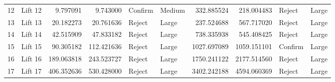 \begin{tabular}{llrrllrrll}
12 &  Lift 12 &           9.797091 &            9.743000 &  Confirm &      Medium &               332.885524 &                218.004483 &   Reject &       Large \\
13 &  Lift 13 &          20.182273 &           20.761636 &   Reject &       Large &               237.524688 &                567.717020 &   Reject &       Large \\
14 &  Lift 14 &          42.515909 &           47.833182 &   Reject &       Large &               738.335938 &                545.408425 &   Reject &       Large \\
15 &  Lift 15 &          90.305182 &          112.421636 &   Reject &       Large &              1027.697089 &               1059.151101 &  Confirm &       Large \\
16 &  Lift 16 &         189.063818 &          243.523727 &   Reject &       Large &              1750.241122 &               2177.514560 &   Reject &       Large \\
17 &  Lift 17 &         406.352636 &          530.428000 &   Reject &       Large &              3402.242188 &               4594.060369 &   Reject &       Large \\
\bottomrule
\end{tabular}

